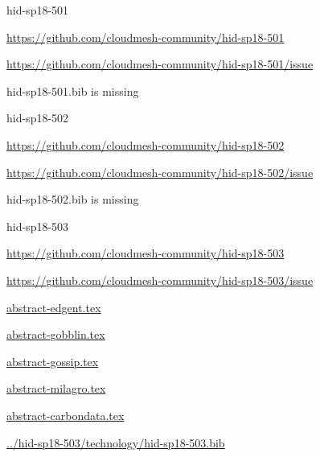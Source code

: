 \begin{IU}

hid-sp18-501

\url{https://github.com/cloudmesh-community/hid-sp18-501}

\url{https://github.com/cloudmesh-community/hid-sp18-501/issue}

hid-sp18-501.bib is missing

\end{IU}


\begin{IU}

hid-sp18-502

\url{https://github.com/cloudmesh-community/hid-sp18-502}

\url{https://github.com/cloudmesh-community/hid-sp18-502/issue}

hid-sp18-502.bib is missing

\end{IU}


\begin{IU}

hid-sp18-503

\url{https://github.com/cloudmesh-community/hid-sp18-503}

\url{https://github.com/cloudmesh-community/hid-sp18-503/issue}

\href{https://github.com/cloudmesh-community/hid-sp18-503/blob/master//technology/abstract-edgent.tex}{abstract-edgent.tex}

\href{https://github.com/cloudmesh-community/hid-sp18-503/blob/master//technology/abstract-gobblin.tex}{abstract-gobblin.tex}

\href{https://github.com/cloudmesh-community/hid-sp18-503/blob/master//technology/abstract-gossip.tex}{abstract-gossip.tex}

\href{https://github.com/cloudmesh-community/hid-sp18-503/blob/master//technology/abstract-milagro.tex}{abstract-milagro.tex}

\href{https://github.com/cloudmesh-community/hid-sp18-503/blob/master//technology/abstract-carbondata.tex}{abstract-carbondata.tex}

\href{https://github.com/cloudmesh-community/hid-sp18-503/blob/master//technology/hid-sp18-503.bib}{../hid-sp18-503/technology/hid-sp18-503.bib}

\end{IU}


